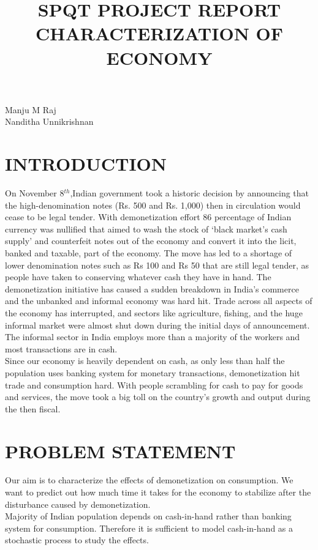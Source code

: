 \documentclass[12pt]{article}
\title{SPQT PROJECT REPORT \\CHARACTERIZATION OF ECONOMY}
\begin{document}
\maketitle


\begin{large}
\begin{center}
	Manju M Raj\\
	Nanditha Unnikrishnan\\
\end{center}	
\end{large}



\newpage
\tableofcontents

\newpage

\section{INTRODUCTION}

On November 8$^{th}$,Indian government took a historic decision by announcing that the high-denomination notes (Rs. 500 and Rs. 1,000) then in circulation would cease to be legal tender.
With demonetization effort 86 percentage of Indian currency was nullified that aimed to wash the stock of ‘black market's cash supply’ and counterfeit notes out of the economy and convert it into the licit, banked and taxable, part of the economy.
The move has led to a shortage of lower denomination notes such as Rs 100 and Rs 50 that are still legal tender, as people have taken to conserving whatever cash they have in hand. The demonetization initiative has caused a sudden breakdown in India’s commerce and the unbanked and informal economy was hard hit. Trade across all aspects of the economy has interrupted, and sectors like agriculture, fishing, and the huge informal market were almost shut down during the initial days of announcement. The informal sector in India employs more than a majority of the workers and most transactions are in cash.
\\
Since our economy is heavily dependent on cash, as only less than half the population uses banking system for monetary transactions, demonetization hit trade and consumption hard. With people scrambling for cash to pay for goods and services, the move took a big toll on the country's growth and output during the then fiscal. 


\section{PROBLEM STATEMENT}
Our aim is to characterize the effects of demonetization on consumption. We want to predict out how much time it takes for the economy to stabilize after the disturbance caused by demonetization. \\
Majority of Indian population depends on cash-in-hand rather than banking system for consumption.
Therefore it is sufficient to model cash-in-hand as a stochastic process to study the effects.
\end{document}

